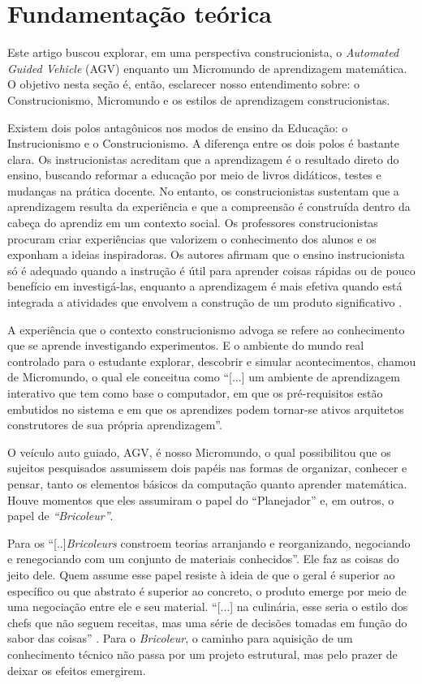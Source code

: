 \documentclass[portuguese]{textolivre}
\begin{document}
\section{Fundamentação teórica}\label{sec-normas}
Este artigo buscou explorar, em uma perspectiva construcionista, o \emph{Automated Guided Vehicle} (AGV) enquanto um Micromundo de aprendizagem matemática. O objetivo nesta seção é, então, esclarecer nosso entendimento sobre: o Construcionismo, Micromundo e os estilos de aprendizagem construcionistas.

Existem dois polos antagônicos nos modos de ensino da Educação: o Instrucionismo e o Construcionismo. A diferença entre os dois polos é bastante clara. Os instrucionistas acreditam que a aprendizagem é o resultado direto do ensino, buscando reformar a educação por meio de livros didáticos, testes e mudanças na prática docente. No entanto, os construcionistas sustentam que a aprendizagem resulta da experiência e que a compreensão é construída dentro da cabeça do aprendiz em um contexto social. Os professores construcionistas procuram criar experiências que valorizem o conhecimento dos alunos e os exponham a ideias inspiradoras. Os autores afirmam que o ensino instrucionista só é adequado quando a instrução é útil para aprender coisas rápidas ou de pouco benefício em investigá-las, enquanto a aprendizagem é mais efetiva quando está integrada a atividades que envolvem a construção de um produto significativo \cite{Papert1986, Martinez2019}.

A experiência que o contexto construcionismo advoga se refere ao conhecimento que se aprende investigando experimentos. E o ambiente do mundo real controlado para o estudante explorar, descobrir e simular acontecimentos,\textcite[p. 151]{Papert1985} chamou de Micromundo, o qual ele conceitua como “[...] um ambiente de aprendizagem interativo que tem como base o computador, em que os pré-requisitos estão embutidos no sistema e em que os aprendizes podem tornar-se ativos arquitetos construtores de sua própria aprendizagem”.

O veículo auto guiado, AGV, é nosso Micromundo, o qual possibilitou que os sujeitos pesquisados assumissem dois papéis nas formas de organizar, conhecer e pensar, tanto os elementos básicos da computação quanto aprender matemática. Houve momentos que eles assumiram o papel do “Planejador” e, em outros, o papel de \emph{“Bricoleur”}.

Para \textcite[p. 6]{Papert1992} os “[..]\emph{Bricoleurs} constroem teorias arranjando e reorganizando, negociando e renegociando com um conjunto de materiais conhecidos”. Ele faz as coisas do jeito dele. Quem assume esse papel resiste à ideia de que o geral é superior ao específico ou que abstrato é superior ao concreto, o produto emerge por meio de uma negociação entre ele e seu material. “[...] na culinária, esse seria o estilo dos chefs que não seguem receitas, mas uma série de decisões tomadas em função do sabor das coisas” \cite[p. 7]{Papert1992}. Para o \emph{Bricoleur}, o caminho para aquisição de um conhecimento técnico não passa por um projeto estrutural, mas pelo prazer de deixar os efeitos emergirem.
\end{document}
